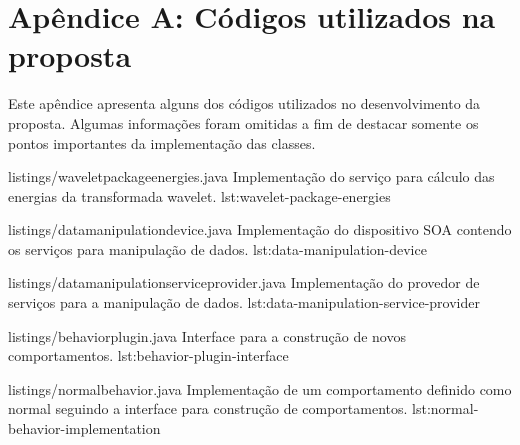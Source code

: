 \chapter*{Apêndice A: Códigos utilizados na proposta}
\label{app:codigo-entidades}

Este apêndice apresenta alguns dos códigos utilizados no desenvolvimento da proposta. Algumas
informações foram omitidas a fim de destacar somente os pontos importantes da implementação das
classes.

  {listings/waveletpackageenergies.java}
  {Implementação do serviço para cálculo das energias da transformada wavelet.}
  {lst:wavelet-package-energies}

  {listings/datamanipulationdevice.java}
  {Implementação do dispositivo SOA contendo os serviços para manipulação de dados.}
  {lst:data-manipulation-device}

  {listings/datamanipulationserviceprovider.java}
  {Implementação do provedor de serviços para a manipulação de dados.}
  {lst:data-manipulation-service-provider}

  {listings/behaviorplugin.java}
  {Interface para a construção de novos comportamentos.}
  {lst:behavior-plugin-interface}

  {listings/normalbehavior.java}
  {Implementação de um comportamento definido como normal seguindo a interface para construção de
      comportamentos.}
  {lst:normal-behavior-implementation}
